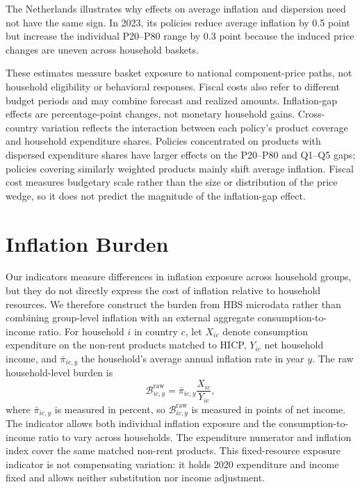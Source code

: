 \documentclass[11pt]{article}
\begin{document}
The Netherlands illustrates why effects on average inflation and dispersion need not have the same
sign. In 2023, its policies reduce average inflation by 0.5 point but increase the individual
P20--P80 range by 0.3 point because the induced price changes are uneven across household baskets.

These estimates measure basket exposure to national component-price paths, not household
eligibility or behavioral responses. Fiscal costs also refer to different budget periods and may
combine forecast and realized amounts. Inflation-gap effects are
percentage-point changes, not monetary household gains.
Cross-country variation reflects the interaction between each policy's product coverage and household
expenditure shares. Policies concentrated on products with dispersed expenditure shares have larger
effects on the P20--P80 and Q1--Q5 gaps; policies covering similarly weighted products mainly shift
average inflation. Fiscal cost measures budgetary scale rather than the size or distribution of the
price wedge, so it does not predict the magnitude of the inflation-gap effect.




\section{Inflation Burden}
\label{sec:inflation-burden}

Our indicators measure differences in inflation exposure across household groups, but they do
not directly express the cost of inflation relative to household resources. We therefore construct
the burden from HBS microdata rather than combining group-level inflation with an external aggregate
consumption-to-income ratio. For household $i$ in country $c$, let $X_{ic}$ denote consumption
expenditure on the non-rent products matched to HICP, $Y_{ic}$ net household income, and
$\bar{\pi}_{ic,y}$ the household's average annual inflation rate in year $y$. The raw
household-level burden is
\begin{equation}
\mathcal{B}^{\mathrm{raw}}_{ic,y}=\bar{\pi}_{ic,y}\frac{X_{ic}}{Y_{ic}},
\label{eq:micro-inflation-burden}
\end{equation}
where $\bar{\pi}_{ic,y}$ is measured in percent, so $\mathcal{B}^{\mathrm{raw}}_{ic,y}$ is measured
in points of net income. The indicator allows both individual inflation exposure and the
consumption-to-income ratio to vary across households. The expenditure numerator and inflation
index cover the same matched non-rent products. This fixed-resource exposure indicator is not
compensating variation: it holds 2020 expenditure and income fixed and allows neither substitution
nor income adjustment.
\end{document}

